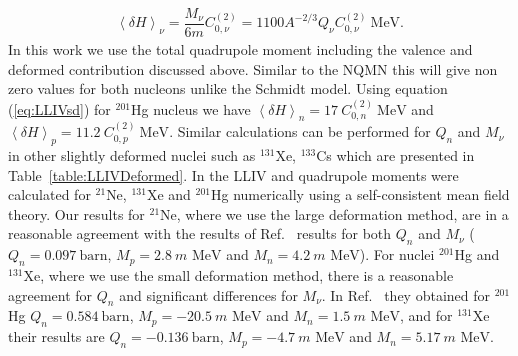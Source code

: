 \documentclass[10pt,a4paper, twoside, openright]{report}
\begin{document}
\begin{align} \label{eq:LLIVsd}
\left<\delta H\right>_{\nu} = \dfrac{M_\nu}{6m} C_{0, \nu}^{(2)} = 1100A^{-2/3}Q_{\nu} C_{0, \nu}^{(2)} \ \text{MeV}.
\end{align}
In this work we use the total quadrupole moment including the valence and deformed contribution discussed above. Similar to the NQMN this will give non zero values for both nucleons unlike the Schmidt model. Using equation (\ref{eq:LLIVsd}) for $^{201}$Hg nucleus we have $\left<\delta H\right>_{n} = 17 \ C_{0, n}^{(2)} \ \text{MeV}$ and $\left<\delta H\right>_{p} = 11.2 \ C_{0, p}^{(2)} \ \text{MeV}$. Similar calculations can be performed for $Q_n$ and $M_{\nu}$ in other slightly deformed nuclei such as $^{131}$Xe, $^{133}$Cs which are presented in Table~\ref{table:LLIVDeformed}. In \cite{Brown2016} the LLIV and quadrupole moments were calculated for $^{21}$Ne, $^{131}$Xe and $^{201}$Hg numerically using a self-consistent mean field theory. 
Our results for $^{21}$Ne, where we  use the large deformation method, are in a reasonable agreement  with the results of Ref.~\cite{Brown2016} results for both $Q_{n}$ and $M_{\nu}$ ($Q_n = 0.097 \ \text{barn}$, $M_{p} = 2.8 \ m\text{ MeV}$ and $M_n = 4.2 \ m\text{ MeV}$). For nuclei  $^{201}$Hg  and $^{131}$Xe, where we use the small deformation method, there is a reasonable agreement for $Q_n$ and significant differences for $M_{\nu}$. In Ref.~\cite{Brown2016}  they obtained for $^{201}$Hg  $Q_n = 0.584 \ \text{barn}$, $M_{p} = -20.5 \ m\text{ MeV}$ and $M_n = 1.5 \ m\text{ MeV}$,  and for $^{131}$Xe their results are $Q_n = -0.136 \ \text{barn}$, $M_{p} = -4.7 \ m\text{ MeV}$ and $M_n = 5.17 \ m\text{ MeV}$.
\end{document}
